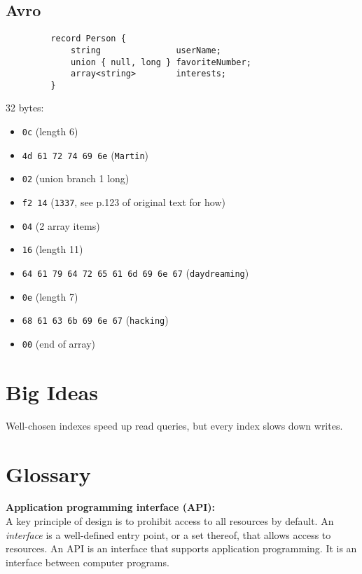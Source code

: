 \documentclass[12pt, titlepage]{article}
\begin{document}
\subsection{Avro}

\begin{verbatim}
         record Person {
             string               userName;
             union { null, long } favoriteNumber;
             array<string>        interests;
         }
\end{verbatim}

32 bytes:

\begin{itemize}
    \item \texttt{0c} (length 6)
    \item \texttt{4d 61 72 74 69 6e} (\texttt{Martin})
    \item \texttt{02} (union branch 1 \textrightarrow long)
    \item \texttt{f2 14} (\texttt{1337}, see p.123 of original text for how)
    \item \texttt{04} (2 array items)
    \item \texttt{16} (length 11)
    \item \texttt{64 61 79 64 72 65 61 6d 69 6e 67} (\texttt{daydreaming})
    \item \texttt{0e} (length 7)
    \item \texttt{68 61 63 6b 69 6e 67} (\texttt{hacking})
    \item \texttt{00} (end of array)
\end{itemize}

\section{Big Ideas}

Well-chosen indexes speed up read queries, but every index slows down writes.

\section{Glossary}

\textbf{Application programming interface (API):} \\

A key principle of design is to prohibit access to all resources by default. An \textit{interface} is a well-defined entry point, or a set thereof, that allows access to resources. An API is an interface that supports application programming. It is an interface between computer programs. \\
\end{document}
